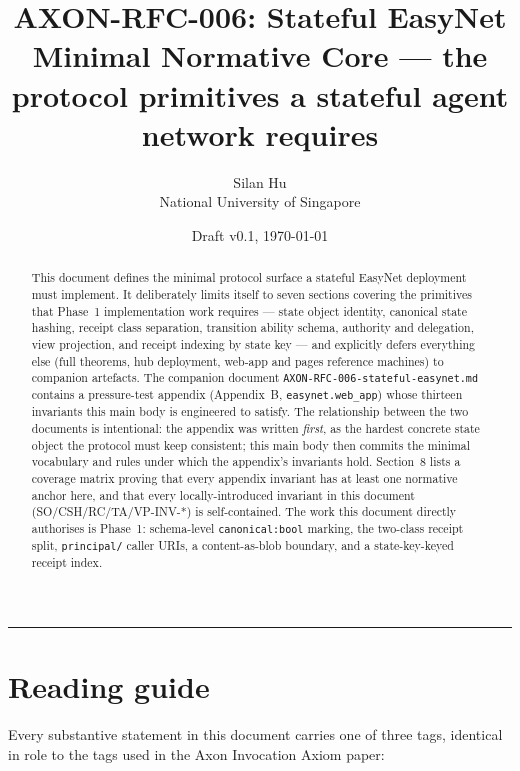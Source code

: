 \documentclass[11pt,a4paper]{article}
\title{
    \vspace{-2em}
    \textbf{\Large AXON-RFC-006: Stateful EasyNet}\\[0.3em]
    \large Minimal Normative Core --- the protocol primitives a stateful
    agent network requires
}
\author{
    Silan Hu \\ \small National University of Singapore
}
\date{Draft v0.1, \today}
\theoremstyle{definition}
\begin{document}
\maketitle

\begin{abstract}
\noindent
This document defines the minimal protocol surface a stateful EasyNet
deployment must implement. It deliberately limits itself to seven
sections covering the primitives that Phase~1 implementation work
requires --- state object identity, canonical state hashing, receipt
class separation, transition ability schema, authority and
delegation, view projection, and receipt indexing by state key ---
and explicitly defers everything else (full theorems, hub
deployment, web-app and pages reference machines) to companion
artefacts. The companion document \texttt{AXON-RFC-006-stateful-easynet.md}
contains a pressure-test appendix (Appendix~B,
\texttt{easynet.web\_app}) whose thirteen
invariants this main body is engineered to satisfy. The relationship
between the two documents is intentional: the appendix was written
\emph{first}, as the hardest concrete state object the protocol must
keep consistent; this main body then commits the minimal vocabulary
and rules under which the appendix's invariants hold. Section~8 lists
a coverage matrix proving that every appendix invariant has at least
one normative anchor here, and that every locally-introduced
invariant in this document (SO/CSH/RC/TA/VP-INV-*) is self-contained.
The work this document directly authorises is Phase~1: schema-level
\texttt{canonical:bool} marking, the two-class receipt split,
\texttt{principal/} caller URIs, a content-as-blob boundary, and a
state-key-keyed receipt index.
\end{abstract}

\tableofcontents
\vspace{1em}
\hrule
\vspace{1em}

\section{Reading guide}
\label{sec:reading-guide}

Every substantive statement in this document carries one of three
tags, identical in role to the tags used in the Axon Invocation
Axiom paper:
\end{document}
